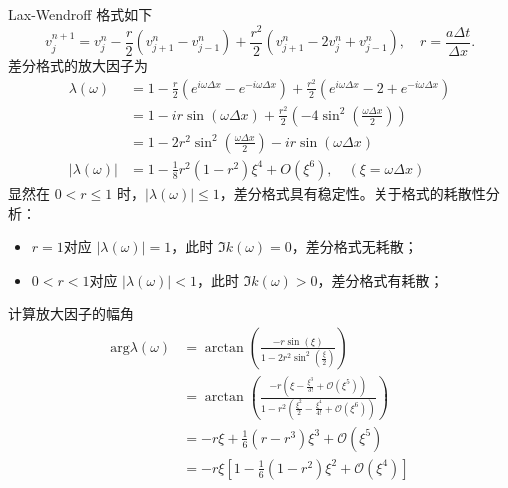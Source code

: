 \begin{solution*}
    Lax-Wendroff 格式如下
    \[
        v_{j}^{n+1}
        = v_j^n - \frac{r}2(v_{j+1}^n- v_{j-1}^n) + \frac{r^2}2
        (v_{j+1}^n-2v_{j}^n+v_{j-1}^n),
        \quad r = \frac{a \Delta t}{\Delta x}.
    \]
    差分格式的放大因子为
    \begin{align*}
        \lambda(\omega)
                          & = 1 - \frac{r}2(e^{i \omega \Delta x} - e^{- i \omega \Delta x})
        + \frac{r^2}2 (e^{i \omega \Delta x} - 2 + e^{- i \omega \Delta x})
        \\
                          & =
        1 - i r \sin(\omega \Delta x)+ \frac{r^2}2 (-4 \sin^2(\frac{\omega\Delta x}2))
        \\
                          & = 1 - 2r^2 \sin^2(\frac{\omega\Delta x}2)
        - i r \sin(\omega \Delta x)                                                          \\
        |\lambda(\omega)| & =
        1 - \frac18 r^2(1 - r^2) \xi^4 + O(\xi^6),\quad (\xi = \omega \Delta x)
    \end{align*}
    显然在 $ 0< r \le 1$ 时，$|\lambda(\omega)| \le 1$，差分格式具有稳定性。关于格式的耗散性分析：
    \begin{itemize}
        \item $r=1$对应 $|\lambda(\omega)| = 1$，此时 $\Im k(\omega) = 0$，差分格式无耗散；
        \item $0<r<1$对应 $|\lambda(\omega)| < 1$，此时 $\Im k(\omega) > 0$，差分格式有耗散；
    \end{itemize}
    计算放大因子的幅角
    \begin{align*}
        \text{arg} \lambda(\omega)
         & =
        \arctan \left(\frac{
                -r \sin(\xi)
            }{
                1 - 2r^2 \sin^2(\frac{\xi}2)
        }     \right)                                            \\
         & =
        \arctan \left(\frac{
                -r (\xi - \frac{\xi^3}{3!} + \mathcal{O}(\xi^5))
            }{
                1 - r^2 \left(
                \frac{\xi^2}2 - \frac{\xi^4}{4!} + \mathcal{O}(\xi^6)
                \right)
        }     \right)                                            \\
         & =
        - r \xi + \frac16 (r -  r^3) \xi^3 +  \mathcal{O}(\xi^5) \\
         & = - r\xi \left[
            1 - \frac16 (1-r^2) \xi^2 +  \mathcal{O}(\xi^4)
            \right]
    \end{align*}

\end{solution*}
